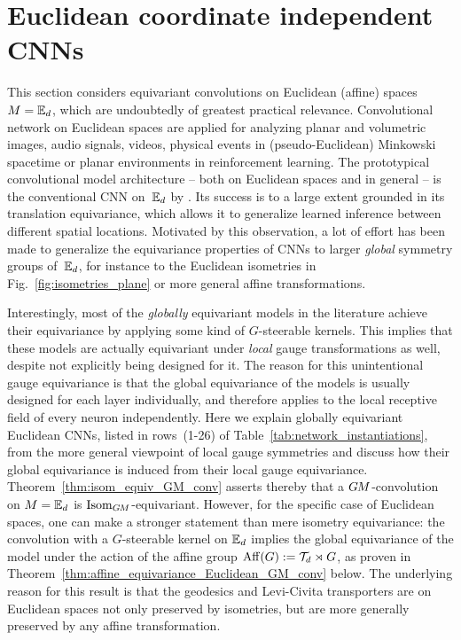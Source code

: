 

\section{Euclidean coordinate independent CNNs}
\label{sec:instantiations_euclidean}

This section considers equivariant convolutions on Euclidean (affine) spaces $M = \mathbb{E}_d$, which are undoubtedly of greatest practical relevance.
Convolutional network on Euclidean spaces are applied for analyzing planar and volumetric images, audio signals, videos, physical events in (pseudo-Euclidean) Minkowski spacetime or planar environments in reinforcement learning.
The prototypical convolutional model architecture -- both on Euclidean spaces and in general -- is the conventional CNN on~$\mathbb{E}_d$ by \citet{LeCun1990CNNs}.
Its success is to a large extent grounded in its translation equivariance, which allows it to generalize learned inference between different spatial locations.
Motivated by this observation, a lot of effort has been made to generalize the equivariance properties of CNNs to larger \emph{global} symmetry groups of~$\mathbb{E}_d$, for instance to the Euclidean isometries in Fig.~\ref{fig:isometries_plane} or more general affine transformations.


Interestingly, most of the \emph{globally} equivariant models in the literature achieve their equivariance by applying some kind of $G$-steerable kernels.
This implies that these models are actually equivariant under \emph{local} gauge transformations as well, despite not explicitly being designed for it.
The reason for this unintentional gauge equivariance is that the global equivariance of the models is usually designed for each layer individually, and therefore applies to the local receptive field of every neuron independently.
Here we explain globally equivariant Euclidean CNNs, listed in rows~(1-26) of Table~\ref{tab:network_instantiations}, from the more general viewpoint of local gauge symmetries and discuss how their global equivariance is induced from their local gauge equivariance.
Theorem~\ref{thm:isom_equiv_GM_conv} asserts thereby that a $G\mkern-1.4muM$-convolution on $M = \mathbb{E}_d$ is $\operatorname{Isom}_{G\mkern-1.4muM}$-equivariant.
However, for the specific case of Euclidean spaces, one can make a stronger statement than mere isometry equivariance:
the convolution with a $G$-steerable kernel on $\mathbb{E}_d$ implies the global equivariance of the model under the action of the affine group $\operatorname{Aff}(G) := \mathcal{T}_d \rtimes G$, as proven in Theorem~\ref{thm:affine_equivariance_Euclidean_GM_conv} below.
The underlying reason for this result is that the geodesics and Levi-Civita transporters are on Euclidean spaces not only preserved by isometries, but are more generally preserved by any affine transformation.

